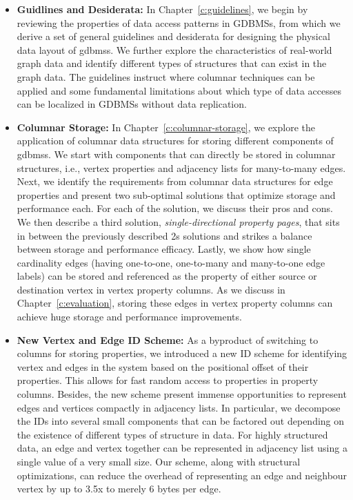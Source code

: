 \begin{itemize}
	\item \textbf{Guidlines and Desiderata:} In Chapter~\ref{c:guidelines}, we begin by reviewing the properties of data access patterns in GDBMSs, from which we derive a set of general guidelines and desiderata for designing the physical data layout of \gls{gdbms}s. We further explore the characteristics of real-world graph data and identify different types of structures that can exist in the graph data. The guidelines instruct where columnar techniques can be applied and some fundamental limitations about which type of data accesses can be localized in GDBMSs without data replication.
	
	\item \textbf{Columnar Storage:} In Chapter~\ref{c:columnar-storage}, we explore the application of columnar data structures for storing different
	components of \gls{gdbms}s. We start with components that can directly be stored in columnar structures, i.e., vertex properties and adjacency lists for many-to-many edges. Next, we identify the requirements from columnar data structures for edge properties and present two sub-optimal solutions that optimize storage and performance each. For each of the solution, we discuss their pros and cons. We then describe a third solution, \emph{single-directional property pages}, that sits in between the previously described 2s solutions and strikes a balance between storage and performance efficacy. Lastly, we show how single cardinality edges (having one-to-one, one-to-many and many-to-one edge labels) can be stored and referenced as the property of either source or destination vertex in vertex property columns. As we discuss in Chapter~\ref{c:evaluation}, storing these edges in vertex property columns can achieve huge storage and performance improvements.
	
	\item \textbf{New Vertex and Edge ID Scheme:} As a byproduct of switching to columns for storing properties, we introduced a new ID scheme for identifying vertex and edges in the system based on the positional offset of their properties. This allows for fast random access to properties in property columns. Besides, the new scheme present immense opportunities to represent edges and vertices compactly in adjacency lists. In particular, we decompose the IDs into several small components that can be factored out depending on the existence of different types of structure in data. For highly structured data, an edge and vertex together can be represented in adjacency list using a single value of a very small size. Our scheme, along with structural optimizations, can reduce the overhead of representing an edge and neighbour vertex by up to 3.5x to merely 6 bytes per edge.
	

\end{itemize}
